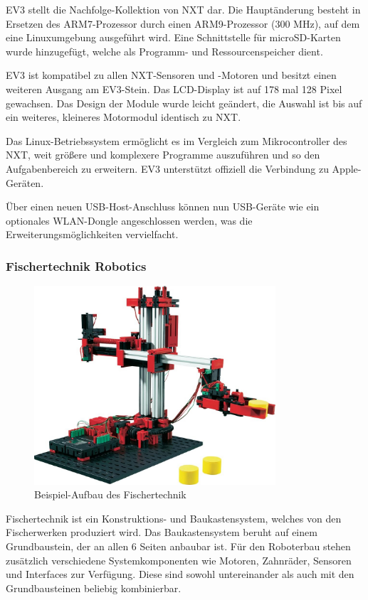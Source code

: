 EV3 stellt die Nachfolge-Kollektion von NXT dar. Die Hauptänderung besteht in Ersetzen des ARM7-Prozessor durch einen ARM9-Prozessor (300 MHz), auf dem eine Linuxumgebung ausgeführt wird. Eine Schnittstelle für microSD-Karten wurde hinzugefügt, welche als Programm- und Ressourcenspeicher dient.

EV3 ist kompatibel zu allen NXT-Sensoren und -Motoren und besitzt einen weiteren Ausgang am EV3-Stein. Das LCD-Display ist auf 178 mal 128 Pixel gewachsen. Das Design der Module wurde leicht geändert, die Auswahl ist bis auf ein weiteres, kleineres Motormodul identisch zu NXT.

Das Linux-Betriebssystem ermöglicht es im Vergleich zum Mikrocontroller des NXT, weit größere und komplexere Programme auszuführen und so den Aufgabenbereich zu erweitern. EV3 unterstützt offiziell die Verbindung zu Apple-Geräten.

Über einen neuen USB-Host-Anschluss können nun USB-Geräte wie ein optionales WLAN-Dongle angeschlossen werden, was die Erweiterungsmöglichkeiten vervielfacht.


\subsubsection{Fischertechnik Robotics}

\begin{figure}[h]
\centering
\includegraphics[width=0.8\textwidth]{Bilder/MatsAndMets/fischer}
\caption{Beispiel-Aufbau des Fischertechnik}
\label{fig:fischertechnik}
\end{figure}

Fischertechnik ist ein Konstruktions- und Baukastensystem, welches von den Fischerwerken produziert wird. Das Baukastensystem beruht auf einem Grundbaustein, der an allen 6 Seiten anbaubar ist. Für den Roboterbau stehen zusätzlich verschiedene Systemkomponenten wie Motoren, Zahnräder, Sensoren und Interfaces zur Verfügung. Diese sind sowohl untereinander als auch mit den Grundbausteinen beliebig kombinierbar.


